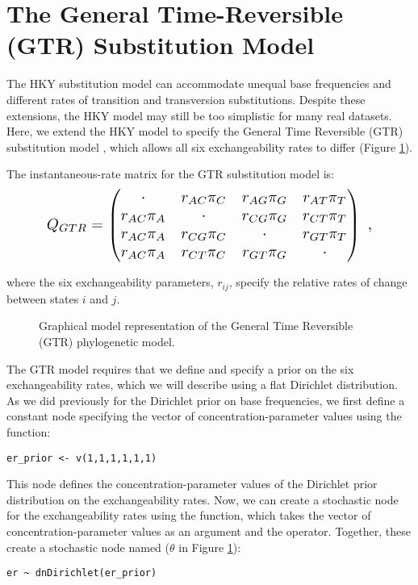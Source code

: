 \newpage
\section{The General Time-Reversible (GTR) Substitution Model}

The HKY substitution model can accommodate unequal base frequencies and different rates of transition and transversion substitutions.
Despite these extensions, the HKY model may still be too simplistic for many real datasets.
Here, we extend the HKY model to specify the General Time Reversible (GTR) substitution model \citep{Tavare1986}, which allows all six exchangeability rates to differ (Figure \ref{fig:gtr}).

The instantaneous-rate matrix for the GTR substitution model is:
\begin{equation*}
\resizebox{4in}{!}{%
$Q_{GTR} = \begin{pmatrix}
{\cdot}	   & {r_{AC}\pi_C} & {r_{AG}\pi_G} & {r_{AT}\pi_T} \\
{r_{AC}\pi_A} & {\cdot}       & {r_{CG}\pi_G} & {r_{CT}\pi_T} \\
{r_{AC}\pi_A} & {r_{CG}\pi_C} & {\cdot}       & {r_{GT}\pi_T} \\
{r_{AC}\pi_A} & {r_{CT}\pi_C} & {r_{GT}\pi_G} & {\cdot}       \\
\end{pmatrix} \mbox{  ,} $}
\end{equation*}

where the six exchangeability parameters, $r_{ij}$, specify the relative rates of change between states $i$ and $j$.  


\begin{figure}[h!]
\centering
{}
\caption{\small Graphical model representation of the General Time Reversible (GTR) phylogenetic model.}
\label{fig:gtr}
\end{figure}

The GTR model requires that we define and specify a prior on the six exchangeability rates, which we will describe using a flat Dirichlet distribution.
As we did previously for the Dirichlet prior on base frequencies, we first define a constant node specifying the vector of concentration-parameter values using the  function:
{\tt \begin{snugshade*}
\begin{lstlisting}
er_prior <- v(1,1,1,1,1,1) 
\end{lstlisting}
\end{snugshade*}}
This node defines the concentration-parameter values of the Dirichlet prior distribution on the exchangeability rates. 
Now, we can create a stochastic node for the exchangeability rates using the  function, which takes the vector of concentration-parameter values as an argument and the \cl{\rbdn} operator. 
Together, these create a stochastic node named  ($\theta$ in Figure \ref{fig:gtr}): 
{\tt \begin{snugshade*}
\begin{lstlisting}
er ~ dnDirichlet(er_prior)
\end{lstlisting}
\end{snugshade*}}


